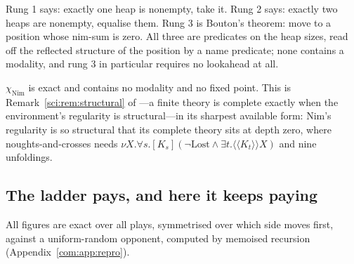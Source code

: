 Rung 1 says: exactly one heap is nonempty, take it. Rung 2 says: exactly two heaps are nonempty,
equalise them. Rung 3 is Bouton's theorem: move to a position whose nim-sum is zero. All three
are predicates on the heap sizes, read off the reflected structure of the position by a name
predicate; none contains a modality, and rung 3 in particular requires no lookahead at all.

\begin{observation}\label{com:complete-theory-nim-name}
$\chi_{\mathrm{Nim}}$ is exact and contains no modality and no fixed point. This is Remark~\ref{sci:rem:structural} of
\chSci---a finite theory is complete exactly when the environment's regularity is
structural---in its sharpest available form: Nim's regularity is so structural that its complete
theory sits at depth zero, where noughts-and-crosses needs $\nu X.\forall s.[K_s](\neg
\mathrm{Lost} \wedge \exists t. \langle\langle K_t\rangle\rangle X)$ and nine unfoldings.
\end{observation}

\subsection{The ladder pays, and here it keeps paying}\label{com:S11.2}

All figures are exact over all plays, symmetrised over which side moves first, against a
uniform-random opponent, computed by memoised recursion (Appendix~\ref{com:app:repro}).

